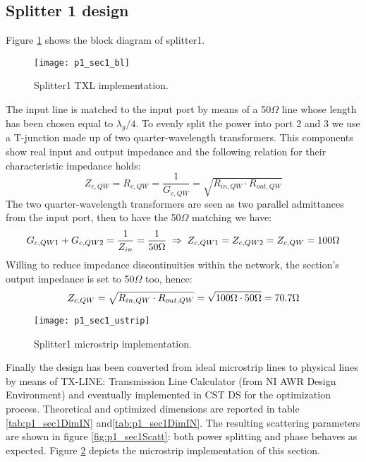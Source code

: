 \subsection{Splitter 1 design}
Figure \ref{fig:p1_sec1_block} shows the block diagram of splitter1. 
\begin{figure}[H] 
	\centering
	\texttt{[image: p1\_sec1\_bl]}
	\caption{Splitter1 TXL implementation. }
	\label{fig:p1_sec1_block}
\end{figure}
The input line is matched to the input port by means of a 50$\Omega$ line whose length has been chosen equal to $\lambda_{g}/4$. To evenly split the power into port 2 and 3 we use a T-junction made up of two quarter-wavelength transformers. This components show real input and output impedance and the following relation for their characteristic impedance holds:
\begin{equation}
	\label{eq:p1_ZcQW}
	Z_{c,QW} =R_{c,QW}=\frac{1}{G_{c,QW}}= \sqrt{R_{in,QW}\cdot R_{out,QW}} 
\end{equation}
The two quarter-wavelength transformers are seen as two parallel admittances from the input port, then to have the 50$\Omega$ matching we have:
\begin{equation}
	G_{c,QW1}+G_{c,QW2}=\frac{1}{Z_{in}}=\frac{1}{50\Omega} \; \Rightarrow \; Z_{c,QW1}=Z_{c,QW2}=Z_{c,QW}=100\Omega \notag
\end{equation}
 Willing to reduce impedance discontinuities within the network, the section's output impedance is set to 50$\Omega$ too, hence:
\begin{equation}
	Z_{c,QW}= \sqrt{R_{in,QW}\cdot R_{out,QW}}=\sqrt{100\Omega\cdot 50\Omega}=70.7\Omega \notag
\end{equation}
\begin{figure}[t] 
	\centering
	\texttt{[image: p1\_sec1\_ustrip]}
	\caption{Splitter1 microstrip implementation. }
	\label{fig:p1_sec1_ustrip}
\end{figure}
Finally the design has been converted from ideal microstrip lines to physical lines by means of TX-LINE: Transmission Line Calculator (from NI AWR Design Environment) and eventually implemented in CST DS\texttrademark{} for the optimization process. 
Theoretical and optimized dimensions are reported in table \ref{tab:p1_sec1DimIN} and\ref{tab:p1_sec1DimIN}. The resulting scattering parameters are shown in figure \ref{fig:p1_sec1Scatt}: both power splitting and phase behaves as expected. Figure \ref{fig:p1_sec1_ustrip} depicts the microstrip implementation of this section.
